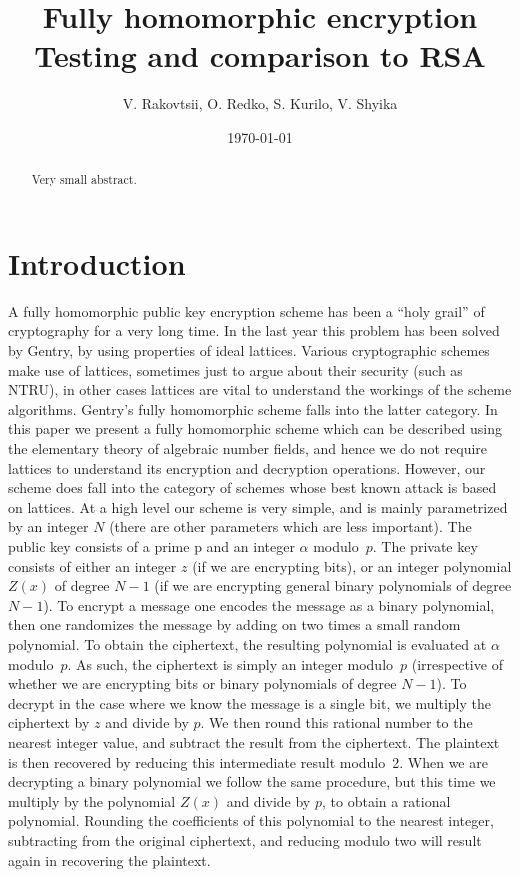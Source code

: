 \documentclass[a4paper, 12pt]{article}
\title{Fully homomorphic encryption \\ \vspace{2mm} {\large Testing and comparison to RSA}}
\author{V. Rakovtsii, O. Redko, S. Kurilo, V. Shyika}
\date{\today}
\begin{document}
	
	\clearpage
	\maketitle
	\thispagestyle{empty}
	
	\clearpage
	\thispagestyle{empty}
	\begin{abstract}
		Very small abstract.
	\end{abstract}
	
	
	\tableofcontents
	
	
	\section{Introduction}
	
	A fully homomorphic public key encryption scheme has been a “holy grail” of cryptography for a very long time.
	In the last year this problem has been solved by Gentry, by using properties of ideal lattices. 
	Various cryptographic schemes make use of lattices, sometimes just to argue about their security (such as NTRU), in other cases lattices are vital to understand the workings of the scheme algorithms. 
	Gentry’s fully homomorphic scheme falls into the latter category.
	In this paper we present a fully homomorphic scheme which can be described using the elementary theory of algebraic number fields, and hence we do not require lattices to understand its encryption and decryption operations. However, our scheme does fall into the category of schemes whose best known attack is based on lattices.
	At a high level our scheme is very simple, and is mainly parametrized by an integer $N$ (there are other parameters which are less important). The public key consists of a prime p and an integer $\alpha$ modulo~$p$.
	The private key consists of either an integer $z$ (if we are encrypting bits), or an integer polynomial $Z(x)$ of degree $N - 1$ (if we are encrypting general binary polynomials of degree $N - 1$).
	To encrypt a message one encodes the message as a binary polynomial, then one randomizes the message by adding on two times a small random polynomial.
	To obtain the ciphertext, the resulting polynomial is evaluated at $\alpha$ modulo~$p$.
	As such, the ciphertext is simply an integer modulo~$p$ (irrespective of whether we are encrypting bits or binary polynomials of degree $N - 1$).
	To decrypt in the case where we know the message is a single bit, we multiply the ciphertext by $z$ and divide by $p$. 
	We then round this rational number to the nearest integer value, and subtract the result from the ciphertext. 
	The plaintext is then recovered by reducing this intermediate result modulo~2. 
	When we are decrypting a binary polynomial we follow the same procedure, but this time we multiply by the polynomial $Z(x)$ and divide by $p$, to obtain a rational polynomial. 
	Rounding the coefficients of this polynomial to the nearest integer, subtracting from the original ciphertext, and reducing modulo two will result again in recovering the plaintext.
	
\end{document}
